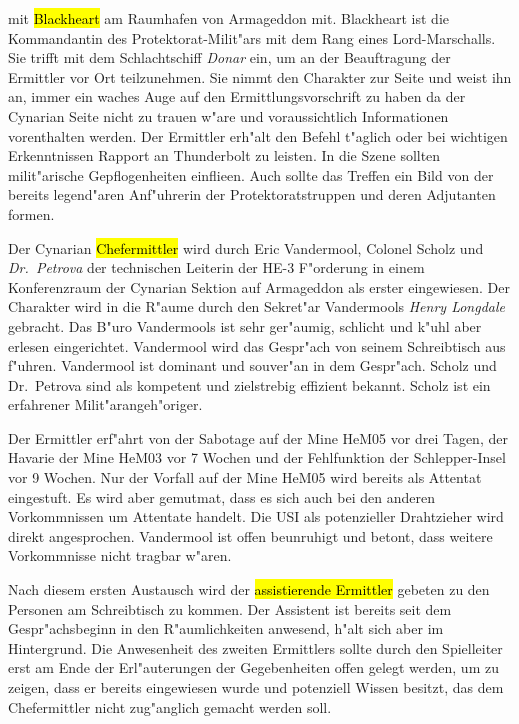 \begin{description}
		mit \hl{Blackheart} am Raumhafen von Armageddon  mit. Blackheart ist die Kommandantin des Protektorat-Milit"ars mit dem Rang eines Lord-Marschalls. Sie trifft mit dem Schlachtschiff \emph{Donar} ein, um an der Beauftragung der Ermittler vor Ort teilzunehmen. Sie nimmt den Charakter zur Seite und weist ihn an, immer ein waches Auge auf den Ermittlungsvorschrift zu haben da der Cynarian Seite nicht zu trauen w"are und voraussichtlich Informationen vorenthalten werden. Der Ermittler erh"alt den Befehl t"aglich oder bei wichtigen Erkenntnissen Rapport an Thunderbolt zu leisten. In die Szene sollten milit"arische Gepflogenheiten einflie\3en. Auch sollte das Treffen ein Bild von der bereits legend"aren Anf"uhrerin der Protektoratstruppen und deren Adjutanten formen.
\end{description}




Der Cynarian \hl{Chefermittler} wird durch Eric Vandermool, Colonel Scholz und \emph{Dr.~Petrova} der technischen Leiterin der HE-3 F"orderung in einem Konferenzraum der Cynarian Sektion auf Armageddon als erster eingewiesen. Der Charakter wird in die R"aume durch den Sekret"ar Vandermools \emph{Henry Longdale} gebracht. Das B"uro Vandermools ist sehr ger"aumig, schlicht und k"uhl aber erlesen eingerichtet. Vandermool wird das Gespr"ach von seinem Schreibtisch aus f"uhren. Vandermool ist dominant und souver"an in dem Gespr"ach. Scholz und Dr.~Petrova sind als kompetent und zielstrebig effizient bekannt. Scholz ist ein erfahrener Milit"arangeh"origer.

Der Ermittler erf"ahrt von der Sabotage auf der Mine HeM05 vor drei Tagen, der Havarie der Mine HeM03 vor 7 Wochen und der Fehlfunktion der Schlepper-Insel vor 9 Wochen. Nur der Vorfall auf der Mine HeM05 wird bereits als Attentat eingestuft. Es wird aber gemutma\3t, dass es sich auch bei den anderen Vorkommnissen um Attentate handelt. Die USI als potenzieller Drahtzieher wird direkt angesprochen. Vandermool ist offen beunruhigt und betont, dass weitere Vorkommnisse nicht tragbar w"aren. 

Nach diesem ersten Austausch wird der \hl{assistierende Ermittler} gebeten zu den Personen am Schreibtisch zu kommen. Der Assistent ist bereits seit dem Gespr"achsbeginn in den R"aumlichkeiten anwesend, h"alt sich aber im Hintergrund. Die Anwesenheit des zweiten Ermittlers sollte durch den Spielleiter  erst am Ende der Erl"auterungen der Gegebenheiten offen gelegt werden, um zu zeigen, dass er bereits eingewiesen wurde und potenziell Wissen besitzt, das dem Chefermittler nicht zug"anglich gemacht werden soll. 

